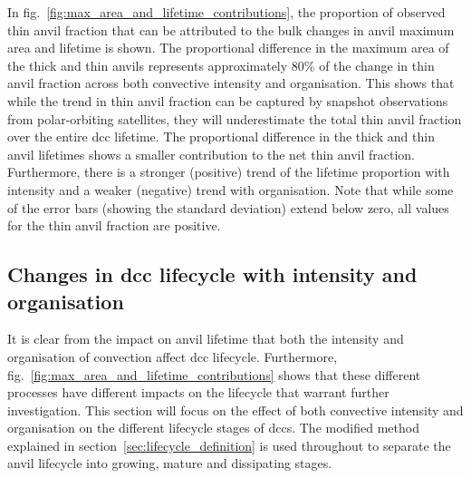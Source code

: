 In fig.~\ref{fig:max_area_and_lifetime_contributions}, the proportion of observed thin anvil fraction that can be attributed to the bulk changes in anvil maximum area and lifetime is shown.
The proportional difference in the maximum area of the thick and thin anvils represents approximately 80\% of the change in thin anvil fraction across both convective intensity and organisation.
This shows that while the trend in thin anvil fraction can be captured by snapshot observations from polar-orbiting satellites, they will underestimate the total thin anvil fraction over the entire \acrshort{dcc} lifetime.
The proportional difference in the thick and thin anvil lifetimes shows a smaller contribution to the net thin anvil fraction.
Furthermore, there is a stronger (positive) trend of the lifetime proportion with intensity and a weaker (negative) trend with organisation.
Note that while some of the error bars (showing the standard deviation) extend below zero, all values for the thin anvil fraction are positive.


\subsection{Changes in \acrshort{dcc} lifecycle with intensity and organisation} \label{sec:lifecycle_results}

It is clear from the impact on anvil lifetime that both the intensity and organisation of convection affect \acrshort{dcc} lifecycle.
Furthermore, fig.~\ref{fig:max_area_and_lifetime_contributions} shows that these different processes have different impacts on the lifecycle that warrant further investigation.
This section will focus on the effect of both convective intensity and organisation on the different lifecycle stages of \acrshort{dcc}s.
The modified \citeauthor{futyan_deep_2007} method explained in section~\ref{sec:lifecycle_definition} is used throughout to separate the anvil lifecycle into growing, mature and dissipating stages.

